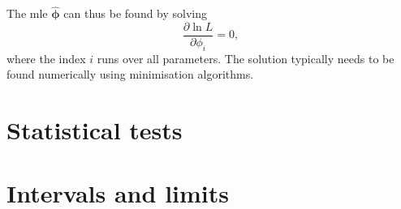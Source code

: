 The \gls{mle} $\boldsymbol{\hat{\phi}}$ can thus be found by solving
\begin{equation}
 \frac{\partial \ln L}{\partial\phi_i} = 0,
\end{equation}
where the index $i$ runs over all parameters. The solution typically needs to be found numerically using minimisation algorithms.

\section{Statistical tests}


\section{Intervals and limits}

